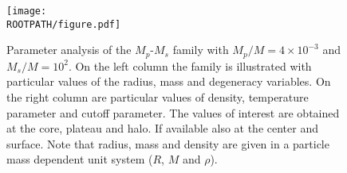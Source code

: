 \begin{figure}%
	\centering%
	\texttt{[image: \\ROOTPATH/figure.pdf]}
	\caption{Parameter analysis of the $M_p$-$M_s$ family with $M_p/M = 4 \times 10^{-3}$ and $M_s/M = 10^{2}$. On the left column the family is illustrated with particular values of the radius, mass and degeneracy variables. On the right column are particular values of density, temperature parameter and cutoff parameter. The values of interest are obtained at the core, plateau and halo. If available also at the center and surface. Note that radius, mass and density are given in a particle mass dependent unit system ($R$, $M$ and $\rho$).}%
	\label{fig:analysis:with-cutoff:MpMs:raw}%
\end{figure}